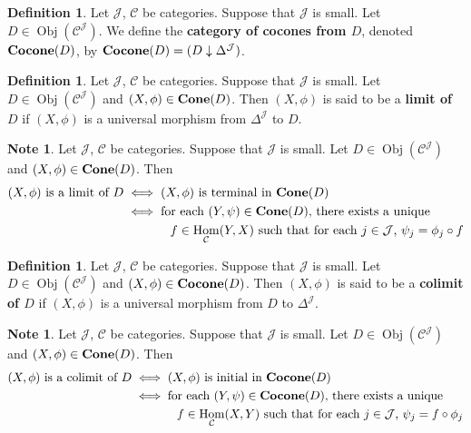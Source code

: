 \documentclass[12pt]{amsart}
\theoremstyle{definition}
\newtheorem{defn}[definition]{Definition}
\newtheorem{note}[definition]{Note}
\newcommand{\Del}{\Delta}
\newcommand{\MC}{\mathcal{C}}
\newcommand{\MJ}{\mathcal{J}}
\newcommand{\tbf}[1]{\textbf{#1}}
\DeclareMathOperator{\Obj}{Obj}
\DeclareMathOperator{\Hom}{Hom}
\DeclareMathOperator*{\0}{\mbf{0}}
\DeclareMathOperator*{\1}{\mbf{1}}
\DeclareMathOperator*{\Cone}{\text{\tbf{Cone}}}
\DeclareMathOperator*{\Cocone}{\text{\tbf{Cocone}}}
\begin{document}
	\begin{defn}
		Let $\MJ$, $\MC$ be categories. Suppose that $\MJ$ is small. Let $D \in \Obj(\MC^{\MJ})$. We define the \textbf{category of cocones from $D$}, denoted $\Cocone(D)$, by $\Cocone(D) = (D \downarrow \Del^{\MJ})$.
	\end{defn}

	\begin{defn}
		Let $\MJ$, $\MC$ be categories. Suppose that $\MJ$ is small. Let $D \in \Obj(\MC^{\MJ})$ and $(X, \phi) \in \Cone(D)$. Then $(X, \phi)$ is said to be a \textbf{limit of $D$} if $(X, \phi)$ is a universal morphism from $\Del^{\MJ}$ to $D$.  
	\end{defn}



	\begin{note}
		Let $\MJ$, $\MC$ be categories. Suppose that $\MJ$ is small. Let $D \in \Obj(\MC^{\MJ})$ and $(X, \phi) \in \Cone(D)$. Then 
		\begin{align*}
			\text{$(X, \phi)$  is a limit of $D$} 
			& \iff \text{$(X, \phi)$ is terminal in $\Cone(D)$} \\
			& \iff \text{for each $(Y, \psi) \in \Cone(D)$, there exists a unique} \\
			& \hspace{1.3cm }\text{$f \in \Hom_{\MC}(Y, X)$ such that for each $j \in \MJ$, $\psi_j = \phi_j \circ f$}
		\end{align*} 
	\end{note} 


	\begin{defn}
		Let $\MJ$, $\MC$ be categories. Suppose that $\MJ$ is small. Let $D \in \Obj(\MC^{\MJ})$ and $(X, \phi) \in \Cocone(D)$. Then $(X, \phi)$ is said to be a \textbf{colimit of $D$} if $(X, \phi)$ is a universal morphism from $D$ to $\Del^{\MJ}$.  
	\end{defn}

	\begin{note}
		Let $\MJ$, $\MC$ be categories. Suppose that $\MJ$ is small. Let $D \in \Obj(\MC^{\MJ})$ and $(X, \phi) \in \Cone(D)$. Then 
		\begin{align*}
			\text{$(X, \phi)$  is a colimit of $D$} 
			& \iff \text{$(X, \phi)$ is initial in $\Cocone(D)$} \\
			& \iff \text{for each $(Y, \psi) \in \Cocone(D)$, there exists a unique} \\
			& \hspace{1.3cm }\text{$f \in \Hom_{\MC}(X, Y)$ such that for each $j \in \MJ$, $\psi_j = f \circ \phi_j $}
		\end{align*} 
	\end{note} 
\end{document}
